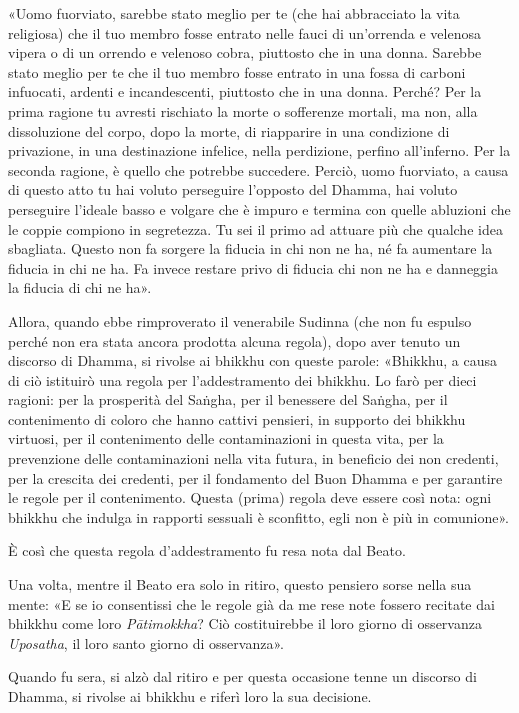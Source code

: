 «Uomo fuorviato, sarebbe stato meglio per te (che hai abbracciato la vita
religiosa) che il tuo membro fosse entrato nelle fauci di un’orrenda e velenosa
vipera o di un orrendo e velenoso cobra, piuttosto che in una donna. Sarebbe
stato meglio per te che il tuo membro fosse entrato in una fossa di carboni
infuocati, ardenti e incandescenti, piuttosto che in una donna. Perché? Per la
prima ragione tu avresti rischiato la morte o sofferenze mortali, ma non, alla
dissoluzione del corpo, dopo la morte, di riapparire in una condizione di
privazione, in una destinazione infelice, nella perdizione, perfino all’inferno.
Per la seconda ragione, è quello che potrebbe succedere. Perciò, uomo fuorviato,
a causa di questo atto tu hai voluto perseguire l’opposto del Dhamma, hai voluto
perseguire l’ideale basso e volgare che è impuro e termina con quelle abluzioni
che le coppie compiono in segretezza. Tu sei il primo ad attuare più che qualche
idea sbagliata. Questo non fa sorgere la fiducia in chi non ne ha, né fa
aumentare la fiducia in chi ne ha. Fa invece restare privo di fiducia chi non ne
ha e danneggia la fiducia di chi ne ha».

Allora, quando ebbe rimproverato il venerabile Sudinna (che non fu espulso
perché non era stata ancora prodotta alcuna regola), dopo aver tenuto un
discorso di Dhamma, si rivolse ai bhikkhu con queste parole: «Bhikkhu, a causa
di ciò istituirò una regola per l’addestramento dei bhikkhu. Lo farò per dieci
ragioni: per la prosperità del Saṅgha, per il benessere del Saṅgha, per il
contenimento di coloro che hanno cattivi pensieri, in supporto dei bhikkhu
virtuosi, per il contenimento delle contaminazioni in questa vita, per la
prevenzione delle contaminazioni nella vita futura, in beneficio dei non
credenti, per la crescita dei credenti, per il fondamento del Buon Dhamma e per
garantire le regole per il contenimento. Questa (prima) regola deve essere così
nota: ogni bhikkhu che indulga in rapporti sessuali è sconfitto, egli non è più
in comunione».

È così che questa regola d’addestramento fu resa nota dal Beato.


Una volta, mentre il Beato era solo in ritiro, questo pensiero sorse nella sua
mente: «E se io consentissi che le regole già da me rese note fossero recitate
dai bhikkhu come loro \emph{Pātimokkha}? Ciò costituirebbe il loro giorno di
osservanza \emph{Uposatha}, il loro santo giorno di osservanza».

Quando fu sera, si alzò dal ritiro e per questa occasione tenne un discorso di
Dhamma, si rivolse ai bhikkhu e riferì loro la sua decisione.

